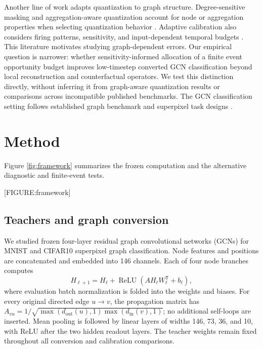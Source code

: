 \documentclass{article}
\begin{document}
Another line of work adapts quantization to graph structure. Degree-sensitive masking and aggregation-aware quantization account for node or aggregation properties when selecting quantization behavior \cite{degreequant2021, a2q2023}. Adaptive calibration also considers firing patterns, sensitivity, and input-dependent temporal budgets \cite{adafire2024}. This literature motivates studying graph-dependent errors. Our empirical question is narrower: whether sensitivity-informed allocation of a finite event opportunity budget improves low-timestep converted GCN classification beyond local reconstruction and counterfactual operators. We test this distinction directly, without inferring it from graph-aware quantization results or comparisons across incompatible published benchmarks. The GCN classification setting follows established graph benchmark and superpixel task designs \cite{dwivedi2023}.

\section{Method}

\label{sec:method}

Figure \ref{fig:framework} summarizes the frozen computation and the alternative diagnostic and finite-event tests.

[FIGURE:framework]

\subsection{Teachers and graph conversion}

\label{sec:teachers_and_graph_conversion}

We studied frozen four-layer residual graph convolutional networks (GCNs) for MNIST and CIFAR10 superpixel graph classification. Node features and positions are concatenated and embedded into 146 channels. Each of four node branches computes
\[
H_{\ell+1}=H_\ell+\operatorname{ReLU}(A H_\ell W_\ell^{\mathsf T}+b_\ell),
\]
where evaluation batch normalization is folded into the weights and biases. For every original directed edge $u\to v$, the propagation matrix has $A_{vu}=1/\sqrt{\max(d_{\mathrm{out}}(u),1)\max(d_{\mathrm{in}}(v),1)}$; no additional self-loops are inserted. Mean pooling is followed by linear layers of widths 146, 73, 36, and 10, with ReLU after the two hidden readout layers. The teacher weights remain fixed throughout all conversion and calibration comparisons.
\end{document}
